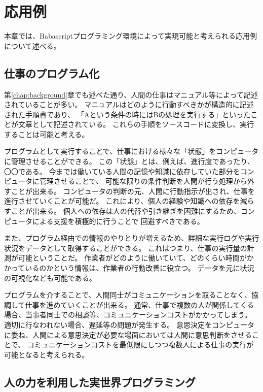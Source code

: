 \chapter{応用例}\label{chap:application}

本章では、Babascriptプログラミング環境によって実現可能と考えられる応用例について述べる。

\section{仕事のプログラム化}\label{ux4ed5ux4e8bux306eux30d7ux30edux30b0ux30e9ux30e0ux5316}

第\ref{chap:background}章でも述べた通り、人間の仕事はマニュアル等によって記述されていることが多い。
マニュアルはどのように行動すべきかが構造的に記述された手順書であり、
「Aという条件の時にはBの処理を実行する」といったことが文章として記述されている。
これらの手順をソースコードに変換し、実行することは可能と考える。

プログラムとして実行することで、仕事における様々な「状態」をコンピュータに管理させることができる。
この「状態」とは、例えば、進行度であったり、〇〇である。
今までは働いている人間の記憶や知識に依存していた部分をコンピュータに管理させることで、
可能な限りの条件判断を人間が行う処理から外すことが出来る。
コンピュータの判断の元、人間に行動指示が出され、仕事を進行させていくことが可能だ。
これにより、個人の経験や知識への依存を減らすことが出来る。
個人への依存は人の代替や引き継ぎを困難にするため、コンピュータによる支援を積極的に行うことで
回避すべきである。

また、プログラム経由での情報のやりとりが増えるため、詳細な実行ログや実行状況をデータとして取得することができる。
これはつまり、仕事の実行量の計測が可能ということだ。
作業者がどのように働いていて、どのくらい時間がかかっているのかという情報は、作業者の行動改善に役立つ。
データを元に状況の可視化なども可能である。

プログラムを介することで、人間同士がコミュニケーションを取ることなく、協調して仕事を進めていくことが出来る。
通常、仕事で複数の人が関係してくる場合、当事者同士での相談等、コミュニケーションコストがかかってしまう。
適切に行なわれない場合、遅延等の問題が発生する。
意思決定をコンピュータに委ね、人間による意思決定が必要な場面においては人間に意思判断をさせることで、
コミュニケーションコストを最低限にしつつ複数人による仕事の実行が可能となると考えられる。

\section{人の力を利用した実世界プログラミング}\label{ux4ebaux306eux529bux3092ux5229ux7528ux3057ux305fux5b9fux4e16ux754cux30d7ux30edux30b0ux30e9ux30dfux30f3ux30b0}

